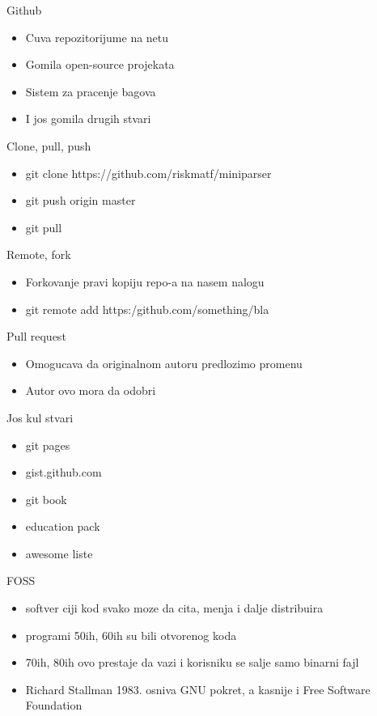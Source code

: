 \documentclass{beamer}
\begin{document}
	\begin{frame}{Github}
		\begin{itemize}
			\item Cuva repozitorijume na netu
			\item Gomila open-source projekata
			\item Sistem za pracenje bagova
			\item I jos gomila drugih stvari
		\end{itemize}
	\end{frame}
	
	\begin{frame}{Clone, pull, push}
		\begin{itemize}
			\item git clone https://github.com/riskmatf/miniparser
			\item git push origin master
			\item git pull
		\end{itemize}
	\end{frame}
	
	\begin{frame}{Remote, fork}
		\begin{itemize}
			\item Forkovanje pravi kopiju repo-a na nasem nalogu
			\item git remote add https:/github.com/something/bla
		\end{itemize}
	\end{frame}
	
	\begin{frame}{Pull request}
		\begin{itemize}
			\item Omogucava da originalnom autoru predlozimo promenu
			\item Autor ovo mora da odobri
		\end{itemize}
	\end{frame}
	
	\begin{frame}{Jos kul stvari}
		\begin{itemize}
			\item git pages
			\item gist.github.com
			\item git book
			\item education pack
			\item awesome liste
		\end{itemize}
	\end{frame}

	\begin{frame}{FOSS}
		\begin{itemize}
		\item softver ciji kod svako moze da cita, menja i dalje distribuira
		\item programi 50ih, 60ih su bili otvorenog koda
		\item 70ih, 80ih ovo prestaje da vazi i korisniku se salje samo binarni fajl
		\item Richard Stallman 1983. osniva GNU pokret, a kasnije i Free Software Foundation
		\end{itemize}
	\end{frame}
	
\end{document}
